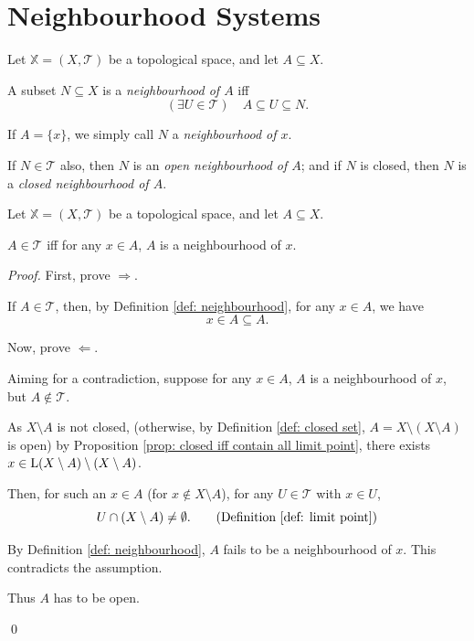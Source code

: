 \section{Neighbourhood Systems}


\begin{definition}
	\label{def: neighbourhood}
	Let $\mathbb X = (X, \mathcal T)$ be a topological space, and let $A \subseteq X$.
	
	A subset $N \subseteq X$ is a \textit{neighbourhood of $A$} iff
	$$
	(\exists U \in \mathcal T) \quad A \subseteq U \subseteq N.
	$$
	
	If $A = \{x\}$, we simply call $N$ a \textit{neighbourhood of $x$}.
	
	If $N \in \mathcal T$ also, then $N$ is an \textit{open neighbourhood of $A$}; and if $N$ is closed, then $N$ is a \textit{closed neighbourhood of $A$}.
\end{definition}


\begin{proposition}
	Let $\mathbb X = (X, \mathcal T)$ be a topological space, and let $A \subseteq X$.
	
	$A \in \mathcal T$ iff for any $x \in A$, $A$ is a neighbourhood of $x$.
	
	\begin{proof}
		First, prove $\Rightarrow$.
		
		If $A \in \mathcal T$, then, by Definition \ref{def: neighbourhood}, for any $x \in A$, we have
		$$
		x \in A \subseteq A.
		$$
		
		\qedlm
		
		Now, prove $\Leftarrow$.
		
		Aiming for a contradiction, suppose for any $x \in A$, $A$ is a neighbourhood of $x$, but $A\notin \mathcal T$.
		
		As $X \setminus A$ is not closed, (otherwise, by Definition \ref{def: closed set}, $A = X \setminus (X \setminus A)$ is open) by Proposition \ref{prop: closed iff contain all limit point}, there exists $x \in \mathrm{L}(X \setminus A) \setminus (X \setminus A)$.
		
		Then, for such an $x \in A$ (for $x \notin X \setminus A$), for any $U \in \mathcal T$ with $x \in U$,
		$$
		U \cap (X \setminus A) \ne \emptyset. \qquad \text{(Definition \ref{def: limit point})}
		$$
		
		By Definition \ref{def: neighbourhood}, $A$ fails to be a neighbourhood of $x$. This contradicts the assumption.
		
		Thus $A$ has to be open.
		
		\qed
	\end{proof}
\end{proposition}




